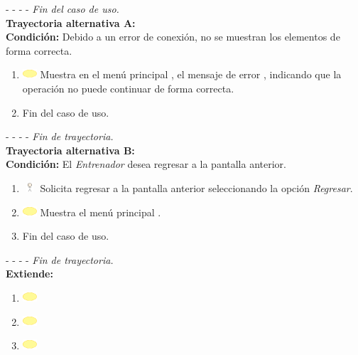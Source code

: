 - - - - \textit{Fin del caso de uso.} \\

\textbf{\large{Trayectoria alternativa A:}}\\
\textbf{Condición: } Debido a un error de conexión, no se muestran los elementos de forma correcta.

\begin{enumerate}
	\item \includegraphics[width=15pt]{./Figuras/iconosCU/herramienta.png} Muestra en el menú principal , el mensaje de error , indicando que la operación no puede continuar de forma correcta.
	\item Fin del caso de uso.
\end{enumerate}

- - - - \textit{Fin de trayectoria.} \\

\textbf{\large{Trayectoria alternativa B:}}\\
\textbf{Condición: } El \textit{Entrenador} desea regresar a la pantalla anterior.

\begin{enumerate}
	\item \includegraphics[width=15pt, height=10pt]{./Figuras/iconosCU/usuario.png} Solicita regresar a la pantalla anterior seleccionando la opción \textit{Regresar}.
	\item \includegraphics[width=15pt]{./Figuras/iconosCU/herramienta.png} Muestra el menú principal .
	\item Fin del caso de uso.
\end{enumerate}

- - - - \textit{Fin de trayectoria.} \\

\textbf{\large{Extiende:}}

\begin{enumerate}
	\item \includegraphics[width=15pt]{./Figuras/iconosCU/herramienta.png} 
	\item \includegraphics[width=15pt]{./Figuras/iconosCU/herramienta.png} 
	\item \includegraphics[width=15pt]{./Figuras/iconosCU/herramienta.png} 
\end{enumerate}
\clearpage